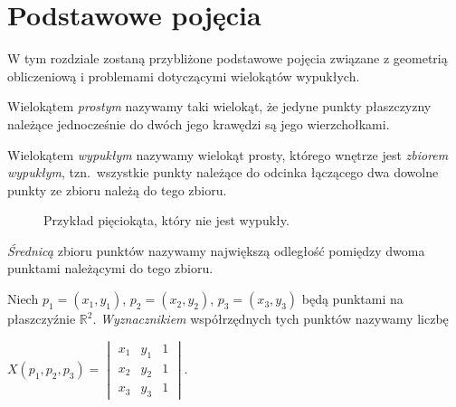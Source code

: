 \chapter{Podstawowe pojęcia}\label{chap:pojecia}
W tym rozdziale zostaną przybliżone podstawowe pojęcia związane
z geometrią obliczeniową i problemami dotyczącymi wielokątów
wypukłych.

\begin{definicja}
  Wielokątem \emph{prostym} nazywamy taki wielokąt, że jedyne punkty
  płaszczyzny należące jednocześnie do dwóch jego krawędzi są jego
  wierzchołkami.
\end{definicja}

\begin{definicja}
  Wielokątem \emph{wypukłym} nazywamy wielokąt prosty, którego wnętrze
  jest \emph{zbiorem wypukłym}, tzn.\ wszystkie punkty należące do
  odcinka łączącego dwa dowolne punkty ze zbioru należą do tego
  zbioru.
\end{definicja}

\begin{figure}[htb]
  \centering
  \caption{Przykład pięciokąta, który nie jest wypukły.}
\end{figure}

\begin{definicja}
  \emph{Średnicą} zbioru punktów nazywamy największą odległość
  pomiędzy dwoma punktami należącymi do tego zbioru.
\end{definicja}

\begin{definicja}
  Niech $p_{1}=(x_{1},y_{1})$, $p_{2}=(x_{2},y_{2})$,
  $p_{3}=(x_{3},y_{3})$ będą punktami na płaszczyźnie
  $\mathbb{R}^2$. \emph{Wyznacznikiem} współrzędnych tych punktów
  nazywamy liczbę

  \begin{center}
    \begin{math}
      X(p_1, p_2, p_3) =
      \begin{vmatrix}
        x_1 & y_1 & 1 \\
        x_2 & y_2 & 1 \\
        x_3 & y_3 & 1
      \end{vmatrix}
      .
    \end{math}
  \end{center}
\end{definicja}

